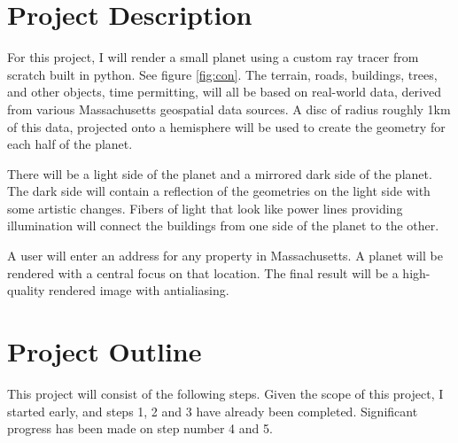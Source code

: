 \documentclass{article}
\begin{document}
\section{Project Description}
For this project, I will render a small planet using a custom ray tracer from scratch built in python. See figure \ref{fig:con}.
The terrain, roads, buildings, trees, and other objects, time permitting, will all
be based on real-world data, derived from various Massachusetts geospatial data sources. A disc of radius roughly 1km
of this data, projected onto a hemisphere will be used to create the geometry for each half of the planet.

There will be a light side of the planet and a mirrored dark side of the planet. The dark side will contain a reflection of the geometries on the light side with some artistic changes. Fibers of light that look like power lines providing illumination will connect the buildings from one side of the planet to the other.

A user will enter an address for any property in Massachusetts. A planet will be rendered with a central focus on that location. The final result will be a high-quality rendered image with antialiasing.

\section{Project Outline}

This project will consist of the following steps. Given the scope of this project, I started early, and steps 1, 2 and 3 have already been completed. Significant progress has been made on step number 4 and 5.
\end{document}
